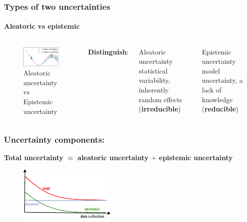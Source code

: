 \begin{frame}
\frametitle{Types of two uncertainties}
\framesubtitle{Aleatoric vs epistemic}

\begin{columns}
        \begin{figure}
        \centering
            \includegraphics[width = 9cm]{figures/aleatoricvsepisidemic.pdf}
            \caption*{Aleatoric uncertainty vs Epistemic uncertainty}
        \end{figure} 
     \textbf{Distinguish}:
     \begin{block}{Aleatoric uncertainty}
statistical variability, inherently random effects (\textbf{irreducible})
     \end{block}
     \begin{block}{Epistemic uncertainty}
model uncertainty, a lack of knowledge (\textbf{reducible})
     \end{block}    
    \end{columns}
\end{frame}
\begin{frame}
\frametitle{Uncertainty components:}
\Large\textbf{Total uncertainty $\approx$ aleatoric uncertainty $+$ epistemic uncertainty}
\begin{figure}
\includegraphics[scale=2.5]{figures/figure-total_Uncertainty.pdf}
\end{figure}

\end{frame}
